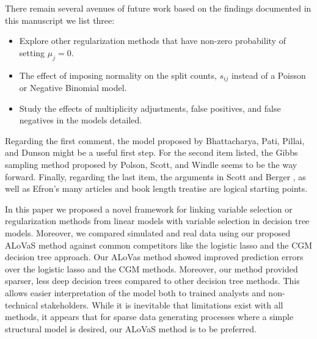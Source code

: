 There remain several avenues of future work based on the findings documented in this manuscript we list three:

\begin{itemize}
\item Explore other regularization methods that have non-zero probability of setting $\mu_j=0$. 
\item The effect of imposing normality on the split counts, $s_{ij}$ instead of a Poisson or Negative Binomial model. 
\item Study the effects of multiplicity adjustments, false positives, and false negatives in the models detailed. 
\end{itemize}

Regarding the first comment, the model proposed by Bhattacharya, Pati, Pillai, and Dunson \cite{bhattacharya2012bayesian} might be a useful first step. For the second item listed, the Gibbs sampling method proposed by Polson, Scott, and Windle \cite{polson2013bayesian} seems to be the way forward. Finally, regarding the last item, the arguments in Scott and Berger \cite{scott2010bayes}, as well as Efron's many articles and book length treatise \cite{efron2009empirical,efron2004large,efron2007correlation,efron2010large} are logical starting points. 

In this paper we proposed a novel framework for linking variable selection or regularization methods from linear models with variable selection in decision tree models. Moreover, we compared simulated and real data using our proposed ALoVaS method against common competitors like the logistic lasso and the CGM decision tree approach. Our ALoVas method showed improved prediction errors over the logistic lasso and the CGM methods. Moreover, our method provided sparser, less deep decision trees compared to other decision tree methods. This allows easier interpretation of the model both to trained analysts and non-technical stakeholders. While it is inevitable that limitations exist with all methods, it appears that for sparse data generating processes where a simple structural model is desired, our ALoVaS method is to be preferred.  
